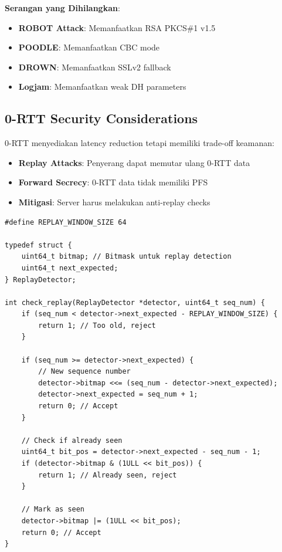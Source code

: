 \textbf{Serangan yang Dihilangkan}:
\begin{itemize}
  \item \textbf{ROBOT Attack}: Memanfaatkan RSA PKCS\#1 v1.5
  \item \textbf{POODLE}: Memanfaatkan CBC mode
  \item \textbf{DROWN}: Memanfaatkan SSLv2 fallback
  \item \textbf{Logjam}: Memanfaatkan weak DH parameters
\end{itemize}

\subsection{0-RTT Security Considerations}

0-RTT menyediakan latency reduction tetapi memiliki trade-off keamanan:

\begin{itemize}
  \item \textbf{Replay Attacks}: Penyerang dapat memutar ulang 0-RTT data
  \item \textbf{Forward Secrecy}: 0-RTT data tidak memiliki PFS
  \item \textbf{Mitigasi}: Server harus melakukan anti-replay checks
\end{itemize}

\begin{lstlisting}[style=cstyle, caption={Anti-Replay Protection}]
#define REPLAY_WINDOW_SIZE 64

typedef struct {
    uint64_t bitmap; // Bitmask untuk replay detection
    uint64_t next_expected;
} ReplayDetector;

int check_replay(ReplayDetector *detector, uint64_t seq_num) {
    if (seq_num < detector->next_expected - REPLAY_WINDOW_SIZE) {
        return 1; // Too old, reject
    }
    
    if (seq_num >= detector->next_expected) {
        // New sequence number
        detector->bitmap <<= (seq_num - detector->next_expected);
        detector->next_expected = seq_num + 1;
        return 0; // Accept
    }
    
    // Check if already seen
    uint64_t bit_pos = detector->next_expected - seq_num - 1;
    if (detector->bitmap & (1ULL << bit_pos)) {
        return 1; // Already seen, reject
    }
    
    // Mark as seen
    detector->bitmap |= (1ULL << bit_pos);
    return 0; // Accept
}
\end{lstlisting}

